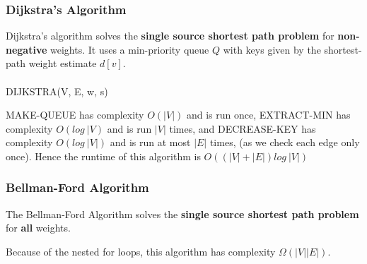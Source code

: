 \documentclass{article}
\begin{document}
        \subsubsection{Dijkstra's Algorithm}
            Dijkstra's algorithm solves the \textbf{single source shortest path problem} for \textbf{non-negative} weights. It uses a min-priority queue $Q$ with keys given by the shortest-path weight estimate $d[v]$. \\ \\
            DIJKSTRA(V, E, w, s)
            \begin{algorithmic}[1]
                \EndFor
                        \EndIf
                    \EndFor
                \EndWhile
            \end{algorithmic}
            MAKE-QUEUE has complexity $O(|V|)$ and is run once, EXTRACT-MIN has complexity $O(log \: |V)$ and is run $|V|$ times, and DECREASE-KEY has complexity $O(log \: |V|)$ and is run at most $|E|$ times, (as we check each edge only once). Hence the runtime of this algorithm is $O((|V| + |E|)log \: |V|)$
        \subsubsection{Bellman-Ford Algorithm}
            The Bellman-Ford Algorithm solves the \textbf{single source shortest path problem} for \textbf{all} weights.
            \begin{algorithmic}[1]
                \EndFor
                        \EndIf
                    \EndFor
                \EndFor
                    \EndIf
                \EndFor
            \end{algorithmic}
            Because of the nested for loops, this algorithm has complexity $\Omega(|V||E|)$.
\end{document}
